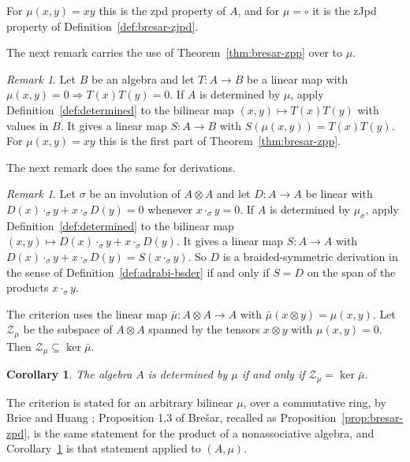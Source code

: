 \documentclass[]{interact}
\theoremstyle{plain}
\newtheorem{corollary}[theorem]{Corollary}
\theoremstyle{definition}
\theoremstyle{remark}
\newtheorem{remark}[theorem]{Remark}
\newcommand{\Zs}{\mathcal{Z}}
\begin{document}
For $\mu(x,y) = xy$ this is the zpd property of $A$, and for $\mu = \circ$ it is the zJpd property of Definition~\ref{def:bresar-zjpd}.

The next remark carries the use of Theorem~\ref{thm:bresar-zpp} over to $\mu$.

\begin{remark}\label{rem:preserving}
Let $B$ be an algebra and let $T \colon A \to B$ be a linear map with $\mu(x,y) = 0 \Rightarrow T(x)T(y) = 0$.
If $A$ is determined by $\mu$, apply Definition~\ref{def:determined} to the bilinear map $(x,y) \mapsto T(x)T(y)$ with values in $B$.
It gives a linear map $S \colon A \to B$ with $S(\mu(x,y)) = T(x)T(y)$.
For $\mu(x,y) = xy$ this is the first part of Theorem~\ref{thm:bresar-zpp}.
\end{remark}

The next remark does the same for derivations. %

\begin{remark}\label{rem:derivations}
Let $\sigma$ be an involution of $A \otimes A$ and let $D \colon A \to A$ be linear with $D(x) \cdot_\sigma y + x \cdot_\sigma D(y) = 0$ whenever $x \cdot_\sigma y = 0$.
If $A$ is determined by $\mu_\sigma$, apply Definition~\ref{def:determined} to the bilinear map $(x,y) \mapsto D(x) \cdot_\sigma y + x \cdot_\sigma D(y)$.
It gives a linear map $S \colon A \to A$ with $D(x) \cdot_\sigma y + x \cdot_\sigma D(y) = S(x \cdot_\sigma y)$.
So $D$ is a braided-symmetric derivation in the sense of Definition~\ref{def:adrabi-bsder} if and only if $S = D$ on the span of the products $x \cdot_\sigma y$.
\end{remark}


The criterion uses the linear map $\bar\mu \colon A \otimes A \to A$ with $\bar\mu(x \otimes y) = \mu(x,y)$.
Let $\Zs_\mu$ be the subspace of $A \otimes A$ spanned by the tensors $x \otimes y$ with $\mu(x,y) = 0$.
Then $\Zs_\mu \subseteq \ker \bar\mu$.

\begin{corollary}\label{cor:criterion}
The algebra $A$ is determined by $\mu$ if and only if $\Zs_\mu = \ker \bar\mu$.
\end{corollary}

\noindent
The criterion is stated for an arbitrary bilinear $\mu$, over a commutative ring, by Brice and Huang
\citep[Theorem 2.3]{BriceHuang2015}; Proposition 1.3 of Bre\v{s}ar, recalled as Proposition~\ref{prop:bresar-zpd}, is the same statement for the product of a nonassociative algebra, and Corollary~\ref{cor:criterion} is that statement applied to $(A,\mu)$.
\end{document}
